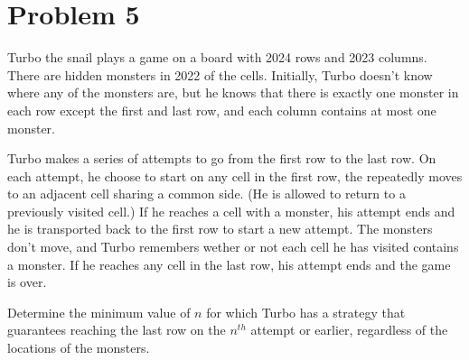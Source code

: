 \documentclass{Math_Note}
\begin{document}
\newpage
\section*{Problem 5}
\begin{prb}
    Turbo the snail plays a game on a board with 2024 rows and 2023 columns. There are hidden monsters in 2022 of the cells. Initially, Turbo doesn't know 
    where any of the monsters are, but he knows that there is exactly one monster in each row except the first and last row, and each column contains at most one monster.

    Turbo makes a series of attempts to go from the first row to the last row. On each attempt, he choose to start on any cell in the first row, the repeatedly moves to an 
    adjacent cell sharing a common side. (He is allowed to return to a previously visited cell.) If he reaches a cell with a monster, his attempt ends and he is transported 
    back to the first row to start a new attempt. The monsters don't move, and Turbo remembers wether or not each cell he has visited contains a monster. If he reaches any 
    cell in the last row, his attempt ends and the game is over.

    Determine the minimum value of $n$ for which Turbo has a strategy that guarantees reaching the last row on the $n^{th}$ attempt or earlier, regardless of the locations 
    of the monsters. 
\end{prb}
\end{document}
